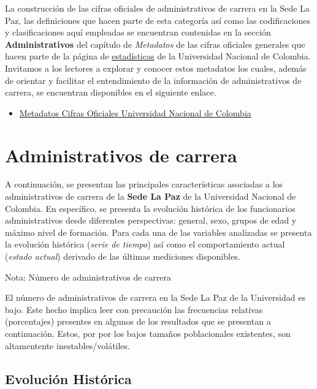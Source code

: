 \documentclass[
]{book}
\providecommand{\tightlist}{%
  \setlength{\itemsep}{0pt}\setlength{\parskip}{0pt}}
\begin{document}
La construcción de las cifras oficiales de administrativos de carrera en la Sede La Paz, las definiciones que hacen parte de esta categoría así como las codificaciones y clasificaciones aquí empleadas se encuentran contenidas en la sección \textbf{Administrativos} del capítulo de \emph{Metadatos} de las cifras oficiales generales que hacen parte de la página de \href{http://estadisticas.unal.edu.co/home/}{estadísticas} de la Universidad Nacional de Colombia. Invitamos a los lectores a explorar y conocer estos metadatos los cuales, además de orientar y facilitar el entendimiento de la información de administrativos de carrera, se encuentran disponibles en el siguiente enlace.

\begin{itemize}
\tightlist
\item
  \href{http://estadisticas.unal.edu.co/menu-principal/cifras-generales/metadatos/cifras-generales/}{Metadatos Cifras Oficiales Universidad Nacional de Colombia}
\end{itemize}

\hypertarget{AdmCar}{%
\section{Administrativos de carrera}\label{AdmCar}}

A continuación, se presentan las principales características asociadas a los administrativos de carrera de la \textbf{Sede La Paz} de la Universidad Nacional de Colombia. En específico, se presenta la evolución histórica de los funcionarios administrativos desde diferentes perspectivas: general, sexo, grupos de edad y máximo nivel de formación. Para cada una de las variables analizadas se presenta la evolución histórica (\emph{serie de tiempo}) así como el comportamiento actual (\emph{estado actual}) derivado de las últimas mediciones disponibles.

Nota: Número de administrativos de carrera

El número de administrativos de carrera en la Sede La Paz de la Universidad es bajo. Este hecho implica leer con precaución las frecuencias relativas (porcentajes) presentes en algunos de los resultados que se presentan a continuación. Estos, por por los bajos tamaños poblacionales existentes, son altamentente inestables/volátiles.

\hypertarget{evoluciuxf3n-histuxf3rica-3}{%
\subsection{Evolución Histórica}\label{evoluciuxf3n-histuxf3rica-3}}
\end{document}

